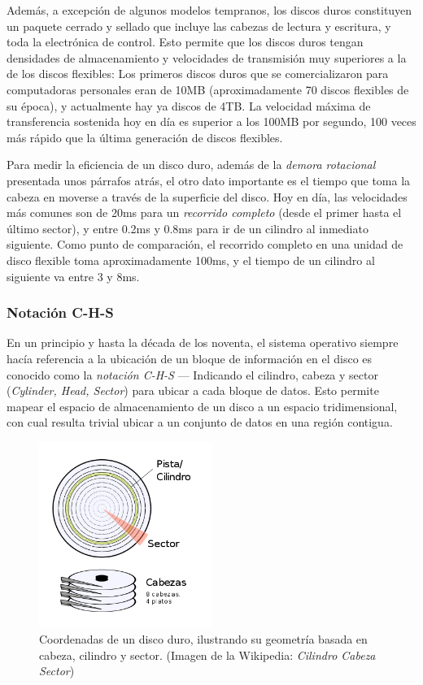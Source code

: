 \documentclass[11pt,fleqn]{book} %
\begin{document}
Además, a excepción de algunos modelos tempranos, los discos duros
constituyen un paquete cerrado y sellado que incluye las cabezas de
lectura y escritura, y toda la electrónica de control. Esto permite
que los discos duros tengan densidades de almacenamiento y velocidades
de transmisión muy superiores a la de los discos flexibles: Los
primeros discos duros que se comercializaron para computadoras
personales eran de 10MB (aproximadamente 70 discos flexibles de su
época), y actualmente hay ya discos de 4TB. La velocidad máxima de
transferencia sostenida hoy en día es superior a los 100MB por
segundo, 100 veces más rápido que la última generación de discos
flexibles.

Para medir la eficiencia de un disco duro, además de la \emph{demora rotacional} presentada unos párrafos atrás, el otro dato importante es
el tiempo que toma la cabeza en moverse a través de la superficie del
disco. Hoy en día, las velocidades más comunes son de 20ms para un
\emph{recorrido completo} (desde el primer hasta el último sector), y entre
0.2ms y 0.8ms para ir de un cilindro al inmediato siguiente. Como
punto de comparación, el recorrido completo en una unidad de disco
flexible toma aproximadamente 100ms, y el tiempo de un cilindro al
siguiente va entre 3 y 8ms.
\subsubsection{Notación C-H-S}
\label{sec-10-1-1-1}


En un principio y hasta la década de los noventa, el sistema operativo
siempre hacía referencia a la ubicación de un bloque de información en
el disco es conocido como la \emph{notación C-H-S} — Indicando el cilindro,
cabeza y sector (\emph{Cylinder, Head, Sector}) para ubicar a cada bloque
de datos. Esto permite mapear el espacio de almacenamiento de un disco
a un espacio tridimensional, con cual resulta trivial ubicar a un
conjunto de datos en una región contigua.

\begin{figure}[htb]
\centering
\includegraphics[width=0.5\textwidth]{./img/cilindro_cabeza_sector.png}
\caption{\label{FS_FIS_disco_duro}Coordenadas de un disco duro, ilustrando su geometría basada en cabeza, cilindro y sector. (Imagen de la Wikipedia: \emph{Cilindro Cabeza Sector})}
\end{figure}
\end{document}
